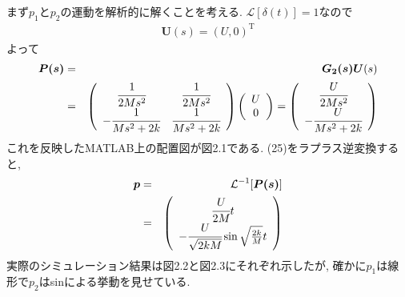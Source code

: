 \documentclass[12pt]{jsarticle}   	%
\begin{document}
\subsection{}
まず$p_1$と$p_2$の運動を解析的に解くことを考える. $\mathcal{L}[\delta(t)] = 1$なので
\begin{eqnarray}
\bm{U}(s) = (U, 0)^{\mathrm{T}}
\end{eqnarray}
よって
\begin{eqnarray}
\bm{P(s)} &=& \bm{G_2(s)}\bm{U}(s) \\
&=&  \left(
    \begin{array}{cc}
      \cfrac{1}{2Ms^2} & \cfrac{1}{2Ms^2} \\
      -\cfrac{1}{Ms^2 + 2k} & \cfrac{1}{Ms^2 + 2k} 
    \end{array}
  \right)\left(
    \begin{array}{c}
      U \\
      0
    \end{array}
   \right) 
= \left(
    \begin{array}{c}
      \cfrac{U}{2Ms^2} \\
      -\cfrac{U}{Ms^2 + 2k}
    \end{array}
   \right) 
\end{eqnarray}
これを反映したMATLAB上の配置図が図2.1である.
\newline
(25)をラプラス逆変換すると, 
\begin{eqnarray}
\bm{p} &=& \mathcal{L}^{-1}[\bm{P(s)}] \\
&=& \left(
    \begin{array}{c}
      \cfrac{U}{2M} t \\
      -\cfrac{U}{\sqrt{2kM}}\sin{\sqrt \frac{2k}{M} t}
    \end{array}
   \right) 
\end{eqnarray}
実際のシミュレーション結果は図2.2と図2.3にそれぞれ示したが, 確かに$p_1$は線形で$p_2$はsinによる挙動を見せている.
\end{document}
